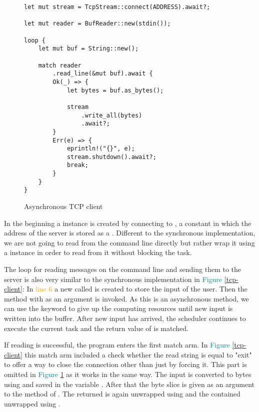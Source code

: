 \begin{figure}[ht]
    \begin{verbatim}
let mut stream = TcpStream::connect(ADDRESS).await?;

let mut reader = BufReader::new(stdin());

loop {
    let mut buf = String::new();

    match reader
        .read_line(&mut buf).await {
        Ok(_) => {
            let bytes = buf.as_bytes();

            stream
                .write_all(bytes)
                .await?;
        }
        Err(e) => {
            eprintln!("{}", e);
            stream.shutdown().await?;
            break;
        }
    }
}
    \end{verbatim}
    \caption{Asynchronous TCP client}
    \label{async-tcp-client}
\end{figure}

In the beginning a  instance is created by connecting to , a constant in
which the address of the server is stored as a . Different to the synchronous implementation, we are not
going to read from the command line directly but rather wrap it using a  instance in order
to read from it without blocking the task.

The loop for reading messages on the command line and sending them to the server is also very similar to the
synchronous implementation in \textcolor{teal}{Figure \ref{tcp-client}}: In \textcolor{orange}{line 6} a new
 called  is created to store the input of the user. Then the  method with
 as an argument is invoked. As this is an asynchronous method, we can use the  keyword to give up
the computing resources until new input is written into the buffer. After new input has arrived, the scheduler
continues to execute the current task and the return value of  is matched.

If reading is successful, the program enters the first match arm. In \textcolor{teal}{Figure \ref{tcp-client}} this
match arm included a check whether the read string is equal to "exit" to offer a way to close the connection other than
just by forcing it. This part is omitted in \textcolor{teal}{Figure \ref{async-tcp-client}} as it works in the same
way. The input is converted to bytes using  and saved in the variable . After that the byte
slice is given as an argument to the  method of . The returned  is again
unwrapped using  and the contained  unwrapped using .

